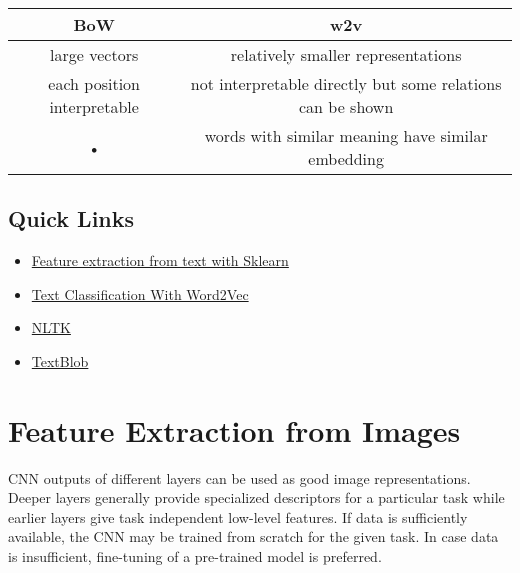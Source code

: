\documentclass[a4paper]{article}
\begin{document}
\begin{tabular}{|c|c|}
\hline 
BoW & w2v \\ 
\hline 
large vectors & relatively smaller representations \\ 
\hline 
each position interpretable & not interpretable directly but some relations can be shown \\ 
\hline 
• & words with similar meaning have similar embedding \\ 
\hline 
\end{tabular}

\subsection{Quick Links}
\begin{itemize}
\item \href{http://scikit-learn.org/stable/modules/feature_extraction.html}{Feature extraction from text with Sklearn}
\item \href{http://nadbordrozd.github.io/blog/2016/05/20/text-classification-with-word2vec/}{Text Classification With Word2Vec}
\item \href{http://www.nltk.org/}{NLTK}
\item \href{https://github.com/sloria/TextBlob}{TextBlob}
\end{itemize}

\section{Feature Extraction from Images}
CNN outputs of different layers can be used as good image representations. Deeper layers generally provide specialized descriptors for a particular task while earlier layers give task independent low-level features. If data is sufficiently available, the CNN may be trained from scratch for the given task. In case data is insufficient, fine-tuning of a pre-trained model is preferred.

%
%
\end{document}
